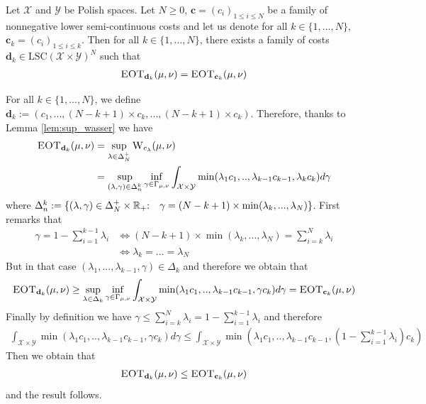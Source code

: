 \begin{prop}
\label{prop:gene-GOT}
Let $\mathcal{X}$ and $\mathcal{Y}$ be Polish spaces. Let $N\geq 0$, $\mathbf{c}=(c_i)_{1\leq i\leq N}$ be a family of nonnegative lower semi-continuous costs and let us denote for all $k\in\{1,\dots,N\}$, $\mathbf{c}_k=(c_i)_{1\leq i\leq k}$. Then for all $k\in\{1,\dots,N\}$, there exists a family of costs $\mathbf{d}_k\in\text{LSC}(\mathcal{X}\times\mathcal{Y})^N$ such that  
\begin{align}
    \textsc{EOT}_{\mathbf{d}_k}(\mu,\nu) = \textsc{EOT}_{\mathbf{c}_k}(\mu,\nu)
\end{align}
\end{prop}
\begin{prv*}
For all $k\in\{1,...,N\}$, we define $\mathbf{d}_k:=(c_1,...,(N-k+1)\times c_k,...,(N-k+1)\times c_k)$. Therefore, thanks to Lemma \ref{lem:sup_wasser} we have
\begin{align}
\textsc{EOT}_{\mathbf{d}_k}(\mu,\nu)& = \sup_{\lambda\in\Delta_N^{+}} \textsc{W}_{c_\lambda}(\mu,\nu) \\
& = \sup_{(\lambda,\gamma)\in\Delta^k_n} \inf_{\gamma\in\Gamma_{\mu,\nu}}\int_{\mathcal{X}\times\mathcal{Y}} \min(\lambda_1 c_1,..,\lambda_{k-1}c_{k-1},\lambda_k c_k) d\gamma
\end{align}
where $\Delta^k_n:=\{(\lambda,\gamma)\in \Delta_N^{+}\times\mathbb{R}_{+}\text{:\quad } \gamma=(N-k+1)\times\min(\lambda_k,...,\lambda_N)\}$.
First remarks that
\begin{align}
    \gamma = 1 - \sum_{i=1}^{k-1} \lambda_i &\iff (N-k+1)\times\min(\lambda_k,...,\lambda_N) = \sum_{i=k}^{N} \lambda_i \\
    &\iff \lambda_k=...=\lambda_N
\end{align}
But in that case $(\lambda_1,...,\lambda_{k-1},\gamma)\in\Delta_k$ and therefore we obtain that 
\begin{align*}
     \textsc{EOT}_{\mathbf{d}_k}(\mu,\nu) \geq \sup_{\lambda\in\Delta_k}\inf_{\gamma\in\Gamma_{\mu,\nu}}  \int_{\mathcal{X}\times\mathcal{Y}} \min(\lambda_1 c_1,..,\lambda_{k-1}c_{k-1},\gamma c_k) d\gamma = \textsc{EOT}_{\mathbf{c}_k}(\mu,\nu) 
\end{align*}
Finally by definition we have  $\gamma\leq \sum_{i=k}^{N} \lambda_i = 1 -  \sum_{i=1}^{k-1} \lambda_i $ and therefore
\begin{align*}
 \int_{\mathcal{X}\times\mathcal{Y}} \min(\lambda_1 c_1,..,\lambda_{k-1}c_{k-1},\gamma c_k) d\gamma \leq  \int_{\mathcal{X}\times\mathcal{Y}} \min\left(\lambda_1 c_1,..,\lambda_{k-1}c_{k-1},\left(1 -  \sum_{i=1}^{k-1} \lambda_i\right) c_k\right) 
\end{align*}
Then we obtain that 
\begin{align*}
     \textsc{EOT}_{\mathbf{d}_k}(\mu,\nu)\leq  \textsc{EOT}_{\mathbf{c}_k}(\mu,\nu) 
\end{align*}
and the result follows.
\end{prv*}

